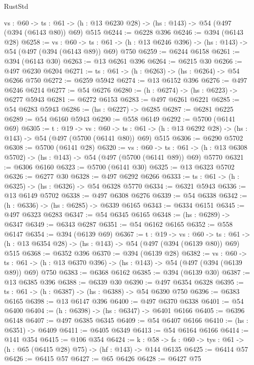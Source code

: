 \begin{lexlean}{RustStd}
\begin{coremodule}
  {vs : @60} ->
  {ts : @61} -> (h : @13 @6230 @28) -> (hs : @143) -> @54 (@497 (@394 (@6143 @80)) @69) @515
@6244 := @6228 @396
@6246 := @394 (@6143 @28)
@6258 := {vs : @60} ->
  {ts : @61} -> (h : @13 @6246 @396) -> (hs : @143) -> @54 (@497 (@394 (@6143 @89)) @69) @750
@6259 := @6244 @6158
@6261 := @394 (@6143 @30)
@6263 := @13 @6261 @396
@6264 := @6215 @30
@6266 := @497 @6230 @6204
@6271 := {ts : @61} -> (h : @6263) -> (hs : @6264) -> @54 @6266 @750
@6272 := @6259 @5942
@6274 := @13 @6152 @396
@6276 := @497 @6246 @6214
@6277 := @54 @6276
@6280 := (h : @6274) -> (hs : @6223) -> @6277 @5943
@6281 := @6272 @6153
@6283 := @497 @6261 @6221
@6285 := @54 @6283 @5943
@6286 := (hs : @6227) -> @6285
@6287 := @6281 @6225
@6289 := @54 @6160 @5943
@6290 := @558 @6149
@6292 := @5700 (@6141 @69)
@6305 := {t : @19} ->
  {vs : @60} ->
  {ts : @61} -> (h : @13 @6292 @28) -> (hs : @143) -> @54 (@497 (@5700 (@6141 @80)) @69) @515
@6306 := @6290 @5702
@6308 := @5700 (@6141 @28)
@6320 := {vs : @60} ->
  {ts : @61} -> (h : @13 @6308 @5702) -> (hs : @143) -> @54 (@497 (@5700 (@6141 @89)) @69) @5770
@6321 := @6306 @6160
@6323 := @5700 (@6141 @30)
@6325 := @13 @6323 @5702
@6326 := @6277 @30
@6328 := @497 @6292 @6266
@6333 := {ts : @61} -> (h : @6325) -> (hs : @6326) -> @54 @6328 @5770
@6334 := @6321 @5943
@6336 := @13 @6149 @5702
@6338 := @497 @6308 @6276
@6339 := @54 @6338
@6342 := (h : @6336) -> (hs : @6285) -> @6339 @6165
@6343 := @6334 @6151
@6345 := @497 @6323 @6283
@6347 := @54 @6345 @6165
@6348 := (hs : @6289) -> @6347
@6349 := @6343 @6287
@6351 := @54 @6162 @6165
@6352 := @558 @6147
@6354 := @394 (@6139 @69)
@6367 := {t : @19} ->
  {vs : @60} ->
  {ts : @61} -> (h : @13 @6354 @28) -> (hs : @143) -> @54 (@497 (@394 (@6139 @80)) @69) @515
@6368 := @6352 @396
@6370 := @394 (@6139 @28)
@6382 := {vs : @60} ->
  {ts : @61} -> (h : @13 @6370 @396) -> (hs : @143) -> @54 (@497 (@394 (@6139 @89)) @69) @750
@6383 := @6368 @6162
@6385 := @394 (@6139 @30)
@6387 := @13 @6385 @396
@6388 := @6339 @30
@6390 := @497 @6354 @6328
@6395 := {ts : @61} -> (h : @6387) -> (hs : @6388) -> @54 @6390 @750
@6396 := @6383 @6165
@6398 := @13 @6147 @396
@6400 := @497 @6370 @6338
@6401 := @54 @6400
@6404 := (h : @6398) -> (hs : @6347) -> @6401 @6166
@6405 := @6396 @6148
@6407 := @497 @6385 @6345
@6409 := @54 @6407 @6166
@6410 := (hs : @6351) -> @6409
@6411 := @6405 @6349
@6413 := @54 @6164 @6166
@6414 := @141 @354
@6415 := @106 @354
@6424 := {k : @58} ->
  {fs : @60} -> {tys : @61} -> (h : @65 (@6415 @28) @75) -> (hf : @143) -> @144 @6135
@6425 := @6414 @57
@6426 := @6415 @57
@6427 := @65 @6426
@6428 := @6427 @75

\end{coremodule}
\end{lexlean}
